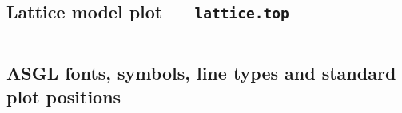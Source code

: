 \vspace{0.4cm}

\begin{verbatim}

\end{verbatim}

\vspace{0.4cm}
\def\epsfsize#1#2{\scalea #1}

\newpage

\subsection{Lattice model plot --- {\tt lattice.top}}

\vspace{1.0cm}

\begin{verbatim}

\end{verbatim}

\vspace{0.4cm}
\def\epsfsize#1#2{\scalea #1}

\newpage


\subsection{{\sc ASGL} fonts, symbols, line types and standard plot positions}

\vspace{1cm}
\def\epsfsize#1#2{\scalea #1}


\vspace{1cm}




